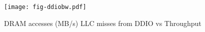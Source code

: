 \begin{figure}[t]
\texttt{[image: fig-ddiobw.pdf]}
\caption{DRAM accesses (MB/s) LLC misses from DDIO vs Throughput}
\label{fig:ddiobw}
\end{figure}
